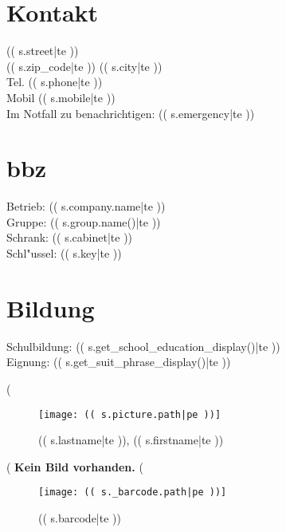 \documentclass[a5paper, oneside, landscape]{scrartcl}
\begin{document}
\begin{minipage}{13cm}
\section*{Kontakt}
(( s.street|te ))\\
(( s.zip_code|te )) (( s.city|te ))\\
Tel. (( s.phone|te ))\\
Mobil (( s.mobile|te ))\\
Im Notfall zu benachrichtigen: (( s.emergency|te ))

\section*{bbz}
Betrieb: (( s.company.name|te ))\\
Gruppe: (( s.group.name()|te ))\\
Schrank: (( s.cabinet|te ))\\
Schl"ussel: (( s.key|te ))

\section*{Bildung}
Schulbildung: (( s.get_school_education_display()|te ))\\
Eignung: (( s.get_suit_phrase_display()|te ))

\end{minipage}
\begin{minipage}{1cm}
\end{minipage}
\begin{minipage}[u]{4cm}
	(%
	\begin{figure}
		\texttt{[image: (( s.picture.path|pe ))]}
		\caption{(( s.lastname|te )), (( s.firstname|te ))}
	\end{figure}
	(%
	\textbf{Kein Bild vorhanden.}
	(%
	\begin{figure}
		\texttt{[image: (( s.\_barcode.path|pe ))]}
		\caption{(( s.barcode|te ))}
	\end{figure}
\end{minipage}
\end{document}
